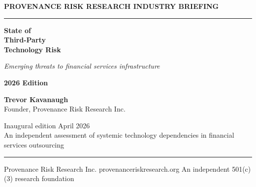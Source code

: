 \begin{titlepage}
  \pagestyle{empty}
  \vspace*{0.7in}

  {\sffamily\bfseries\color{forest}\fontsize{11}{14}\selectfont
  PROVENANCE RISK RESEARCH \textperiodcentered{} INDUSTRY BRIEFING
  \par}

  \vspace{0.3in}
  \noindent\textcolor{forest}{\rule{1.2in}{1.2pt}}

  \vspace{0.5in}
  {\bfseries\fontsize{42}{50}\selectfont State of\\Third-Party\\Technology Risk\par}

  \vspace{0.3in}
  {\sffamily\fontsize{15}{20}\selectfont\color{forestdeep}\itshape
  Emerging threats to financial services infrastructure
  \par}

  \vspace{0.25in}
  {\sffamily\fontsize{22}{26}\selectfont\color{forest}\bfseries 2026 Edition\par}

  \vfill

  {\sffamily\fontsize{12}{16}\selectfont
  \textbf{Trevor Kavanaugh}\\
  {\color{inkmute}Founder, Provenance Risk Research Inc.}
  \par}

  \vspace{0.25in}

  {\sffamily\footnotesize\color{inkmute}
  Inaugural edition \textperiodcentered{} April 2026 \\
  An independent assessment of systemic technology dependencies in financial services outsourcing
  \par}

  \vspace{0.4in}
  \noindent\textcolor{forest}{\rule{\textwidth}{0.5pt}}

  \vspace{0.1in}
  {\sffamily\footnotesize\color{inkmute}
  Provenance Risk Research Inc. \textperiodcentered{} provenanceriskresearch.org \textperiodcentered{} An independent 501(c)(3) research foundation
  \par}
\end{titlepage}

\newpage
